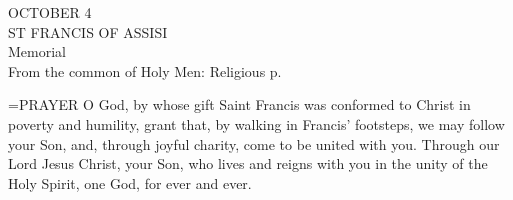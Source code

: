 \begin{center}\normalsize OCTOBER 4\\
\footnotesize ST FRANCIS OF ASSISI\\
\footnotesize Memorial\\
\footnotesize From the common of Holy Men: Religious p. \\
\end{center}

\hangindent=\parindent \small{PRAYER 
O God, by whose gift Saint Francis
was conformed to Christ in poverty and humility,
grant that, by walking in Francis’ footsteps,
we may follow your Son,
and, through joyful charity,
come to be united with you.
Through our Lord Jesus Christ, your Son,
who lives and reigns with you in the unity of the Holy Spirit,
one God, for ever and ever.\\}
 
